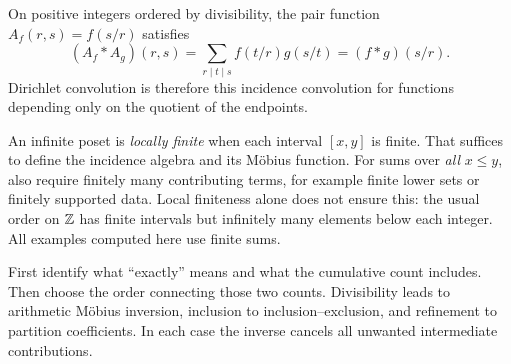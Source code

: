 On positive integers ordered by divisibility, the pair function
$A_f(r,s)=f(s/r)$ satisfies
\[
 (A_f*A_g)(r,s)=\sum_{r\mid t\mid s} f(t/r)g(s/t)
              =(f*g)(s/r).
\]
Dirichlet convolution is therefore this incidence convolution for
functions depending only on the quotient of the endpoints.

\begin{warningbox}[breakable=false]
An infinite poset is \emph{locally finite} when each interval $[x,y]$
is finite. That suffices to define the incidence algebra and its
M\"obius function. For sums over \emph{all} $x\le y$, also require
finitely many contributing terms, for example finite lower sets or
finitely supported data. Local finiteness alone does not ensure this:
the usual order on $\mathbb Z$ has finite intervals but infinitely many
elements below each integer. All examples computed here use finite sums.
\end{warningbox}

\begin{bigidea}
First identify what ``exactly'' means and what the cumulative count
includes. Then choose the order connecting those two counts.
Divisibility leads to arithmetic M\"obius inversion, inclusion to
inclusion--exclusion, and refinement to partition coefficients.
In each case the inverse cancels all unwanted intermediate contributions.
\end{bigidea}
